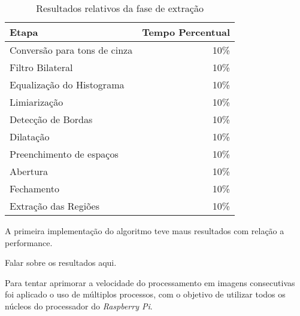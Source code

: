 \begin{table}[H]
\centering
\caption{Resultados relativos da fase de extração}
\label{tab:resultados_relativos}
\begin{tabular}{@{}lr@{}}
\toprule
Etapa                        & Tempo Percentual \\ \midrule
Conversão para tons de cinza & 10\%             \\
Filtro Bilateral             & 10\%             \\
Equalização do Histograma    & 10\%             \\
Limiarização                 & 10\%             \\
Detecção de Bordas           & 10\%             \\
Dilatação                    & 10\%             \\
Preenchimento de espaços     & 10\%             \\
Abertura                     & 10\%             \\
Fechamento                   & 10\%             \\
Extração das Regiões         & 10\%             \\ \bottomrule
\end{tabular}
\end{table}

A primeira implementação do algoritmo teve maus resultados com relação a
performance.

Falar sobre os resultados aqui.

Para tentar aprimorar a velocidade do processamento em imagens consecutivas foi
aplicado o uso de múltiplos processos, com o objetivo de utilizar todos os
núcleos do processador do \emph{Raspberry Pi}.
